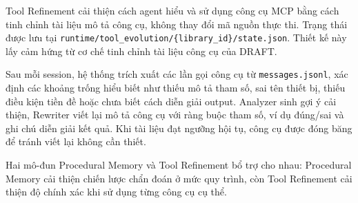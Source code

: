 Tool Refinement cải thiện cách agent hiểu và sử dụng công cụ MCP bằng cách tinh chỉnh tài liệu mô tả công cụ, không thay đổi mã nguồn thực thi. Trạng thái được lưu tại \texttt{runtime/tool\_evolution/\{library\_id\}/state.json}. Thiết kế này lấy cảm hứng từ cơ chế tinh chỉnh tài liệu công cụ của DRAFT.

Sau mỗi session, hệ thống trích xuất các lần gọi công cụ từ \texttt{messages.jsonl}, xác định các khoảng trống hiểu biết như thiếu mô tả tham số, sai tên thiết bị, thiếu điều kiện tiền đề hoặc chưa biết cách diễn giải output. Analyzer sinh gợi ý cải thiện, Rewriter viết lại mô tả công cụ với ràng buộc tham số, ví dụ đúng/sai và ghi chú diễn giải kết quả. Khi tài liệu đạt ngưỡng hội tụ, công cụ được đóng băng để tránh viết lại không cần thiết.

Hai mô-đun Procedural Memory và Tool Refinement bổ trợ cho nhau: Procedural Memory cải thiện chiến lược chẩn đoán ở mức quy trình, còn Tool Refinement cải thiện độ chính xác khi sử dụng từng công cụ cụ thể.
